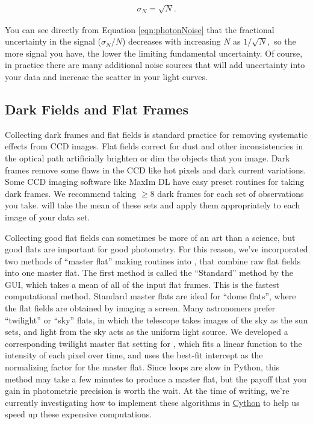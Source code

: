 \documentclass[a4paper]{article}
\begin{document}
\begin{eqnarray}
\sigma_N = \sqrt{N}. \label{eqn:photonNoise}
\end{eqnarray}

\noindent You can see directly from Equation \ref{eqn:photonNoise} that the fractional uncertainty in the signal ($\sigma_N/N$) decreases with increasing $N$ as $1/\sqrt{N},$
so the more signal you have, the lower the limiting fundamental uncertainty. Of course, in practice there are many additional noise sources that will add uncertainty into your data and increase the scatter in your light curves. 
 
\subsection{Dark Fields and Flat Frames}

Collecting dark frames and flat fields is standard practice for removing systematic effects from CCD images. Flat fields correct for dust and other inconsistencies in the optical path artificially brighten or dim the objects that you image. Dark frames remove some flaws in the CCD like hot pixels and dark current variations. Some CCD imaging software like MaxIm DL have easy preset routines for taking dark frames.  We recommend taking $\ge8$ dark frames for each set of observations you take. \oscaar will take the mean of these sets and apply them appropriately to each image of your data set. 

Collecting good flat fields can sometimes be more of an art than a science, but good flats are important for good photometry. For this reason, we've incorporated two methods of ``master flat'' making routines into \oscaar, that combine raw flat fields into one master flat. The first method is called the ``Standard'' method by the \oscaar GUI, which takes a mean of all of the input flat frames. This is the fastest computational method. Standard master flats are ideal for ``dome flats'', where the flat fields are obtained by imaging a screen. Many astronomers prefer ``twilight'' or ``sky'' flats, in which the telescope takes images of the sky as the sun sets, and light from the sky acts as the uniform light source. We developed a corresponding twilight master flat setting for \oscaar, which fits a linear function to the intensity of each pixel over time, and uses the best-fit intercept as the normalizing factor for the master flat. Since loops are slow in Python, this method may take a few minutes to produce a master flat, but the payoff that you gain in photometric precision is worth the wait. At the time of writing, we're currently investigating how to implement these algorithms in \href{http://www.cython.org/}{Cython} to help us speed up these expensive computations.
\end{document}
